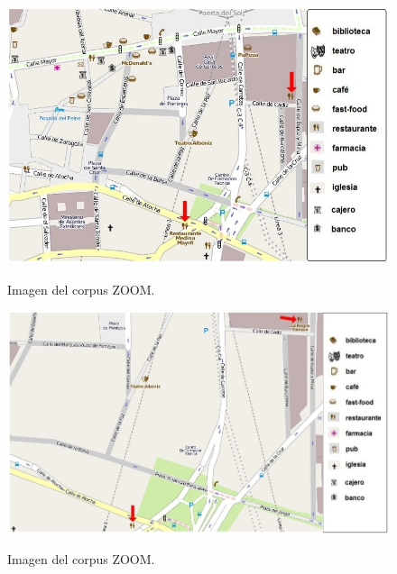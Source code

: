 \begin{figure}
\begin{minipage}[b]{0.48\linewidth}
\centering
\includegraphics[width=\textwidth]{images/corpus/mapa9.png}
\caption{Imagen del corpus ZOOM.}
\label{mapa19}
\end{minipage}
\hspace*{0cm}
\begin{minipage}[b]{0.55\linewidth}
\centering
\includegraphics[width=\textwidth]{images/corpus/mapa19.png}\\[0pt]
\caption{Imagen del corpus ZOOM.}
\label{mapa20}
\end{minipage}
\end{figure}

